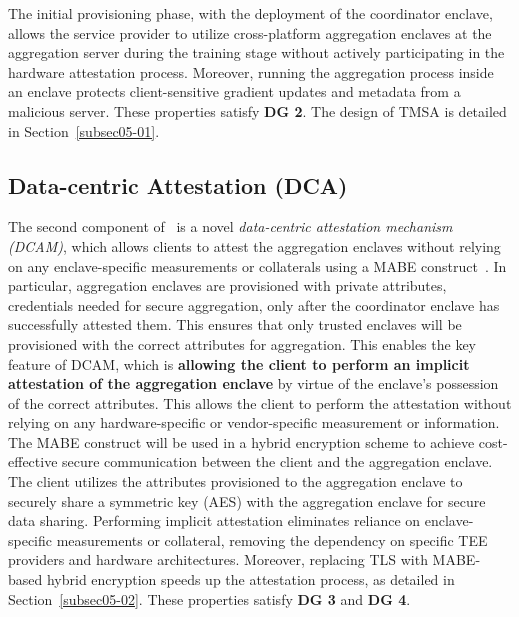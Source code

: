 The initial provisioning phase, with the deployment of the coordinator enclave, allows the service provider to utilize cross-platform aggregation enclaves at the aggregation server during the training stage without actively participating in the hardware attestation process. Moreover, running the aggregation process inside an enclave protects client-sensitive gradient updates and metadata from a malicious server. These properties satisfy \textbf{DG 2}. The design of TMSA is detailed in Section~\ref{subsec05-01}.


\subsection{Data-centric Attestation (DCA)}
\label{subsec04-02}
The second component of \sysname~is a novel {\it data-centric attestation mechanism (DCAM)}, which allows clients to attest the aggregation enclaves without relying on any enclave-specific measurements or collaterals using a MABE construct~\cite{ChaCho09}. %
In particular, aggregation enclaves are provisioned with private attributes, \ie credentials needed for secure aggregation, only after the coordinator enclave has successfully attested them. 
This ensures that only trusted enclaves will be provisioned with the correct attributes for aggregation. This enables the key feature of DCAM, which is {\bf allowing the client to perform an implicit attestation of the aggregation enclave} by virtue of the enclave's possession of the correct attributes.
This allows the client to perform the attestation without relying on any hardware-specific or vendor-specific measurement or information. 
The MABE construct will be used in a hybrid encryption scheme to achieve cost-effective secure communication between the client and the aggregation enclave. The client utilizes the attributes provisioned to the aggregation enclave to securely share a symmetric key (\eg AES) with the aggregation enclave for secure data sharing. 
Performing implicit attestation eliminates reliance on enclave-specific measurements or collateral, removing the dependency on specific TEE providers and hardware architectures. Moreover, replacing TLS with MABE-based hybrid encryption speeds up the attestation process, as detailed in Section~\ref{subsec05-02}. These properties satisfy \textbf{DG 3} and \textbf{DG 4}. %



